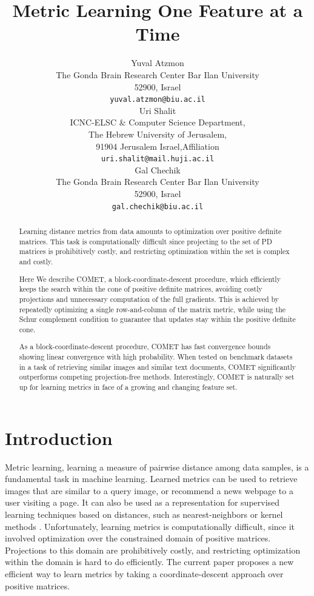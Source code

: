 \documentclass{article} %
\title{Metric Learning One Feature at a Time}
\author{
Yuval Atzmon \\
The Gonda Brain Research Center
Bar Ilan University\\
52900, Israel\\
\texttt{yuval.atzmon@biu.ac.il} \\
\And
Uri Shalit \\
ICNC-ELSC & Computer Science Department, \\
The Hebrew University of Jerusalem, \\
91904 Jerusalem Israel,Affiliation \\
\texttt{uri.shalit@mail.huji.ac.il} \\
\AND
Gal Chechik \\
The Gonda Brain Research Center
Bar Ilan University\\
52900, Israel\\
\texttt{gal.chechik@biu.ac.il}
}
\begin{document}
\maketitle
\vspace{-20pt}
\begin{abstract} 
Learning distance metrics from data amounts to optimization over positive definite matrices. This task   is computationally difficult since projecting to the set of PD matrices is prohibitively costly, and restricting optimization within the set is complex and costly.

Here We describe COMET, a block-coordinate-descent procedure, which efficiently keeps the search within the cone of positive definite matrices, avoiding costly projections and unnecessary computation of the full gradients. This is achieved by repeatedly optimizing a single row-and-column of the matrix metric, while using the Schur complement condition to guarantee that updates stay within the positive definite cone. 

As a block-coordinate-descent procedure, COMET has fast convergence bounds showing linear convergence with high probability. When tested on benchmark datasets in a task of retrieving similar images and similar text documents, COMET significantly outperforms competing projection-free methods. Interestingly, COMET is naturally set up for learning metrics in face of a growing and changing feature set.
\end{abstract} 

\section{Introduction}
Metric learning, learning a measure of pairwise distance among data samples, is a fundamental task in machine learning. Learned metrics can be used to retrieve images that are similar to a query image, or recommend a news webpage to a user visiting a page. It can also be used as a representation for supervised learning techniques based on distances, such as nearest-neighbors or kernel methods \cite{kulis2012survey}. Unfortunately, learning metrics is computationally difficult, since it involved optimization over the constrained domain of positive matrices. Projections to this domain are prohibitively costly, and restricting optimization within the domain is hard to do efficiently. The current paper proposes a new efficient way to learn metrics by taking a coordinate-descent approach over positive matrices.
\end{document}
